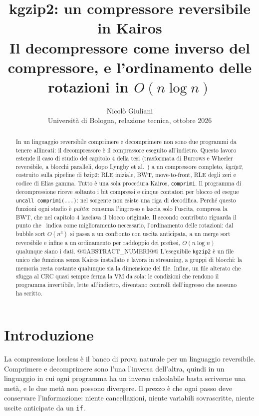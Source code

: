 \documentclass[11pt,a4paper]{article}
\title{\textbf{kgzip2: un compressore reversibile in Kairos}\\[4pt]
\large Il decompressore come inverso del compressore, e l'ordinamento delle rotazioni in $O(n\log n)$}
\author{Nicolò Giuliani\\[2pt]\small Università di Bologna, relazione tecnica, ottobre 2026}
\date{}
\newcommand{\kw}[1]{\texttt{#1}}
\begin{document}
\maketitle

\begin{abstract}
In un linguaggio reversibile comprimere e decomprimere non sono due programmi da tenere allineati: il decompressore è il compressore eseguito all'indietro. Questo lavoro estende il caso di studio del capitolo 4 della tesi (trasformata di Burrows e Wheeler reversibile, a blocchi paralleli, dopo Lyngby et al.~\cite{lyngby}) a un compressore completo, \emph{kgzip2}, costruito sulla pipeline di bzip2: RLE iniziale, BWT, move-to-front, RLE degli zeri e codice di Elias gamma. Tutto è una sola procedura Kairos, \kw{comprimi}. Il programma di decompressione riceve soltanto i bit compressi e cinque contatori per blocco ed esegue \kw{uncall comprimi(...)}: nel sorgente non esiste una riga di decodifica. Perché questo funzioni ogni stadio è \emph{pulito}: consuma l'ingresso e lascia solo l'uscita, compresa la BWT, che nel capitolo 4 lasciava il blocco originale. Il secondo contributo riguarda il punto che~\cite{lyngby} indica come miglioramento necessario, l'ordinamento delle rotazioni: dal bubble sort $O(n^3)$ si passa a un confronto con uscita anticipata, a un merge sort reversibile e infine a un ordinamento per raddoppio dei prefissi, $O(n\log n)$ qualunque siano i dati. @@ABSTRACT_NUMERI@@ L'eseguibile \kw{kgzip2} è un file unico che funziona senza Kairos installato e lavora in streaming, a gruppi di blocchi: la memoria resta costante qualunque sia la dimensione del file. Infine, un file alterato che sfugga al CRC quasi sempre ferma la VM da sola: le condizioni che rendono il programma invertibile, lette all'indietro, diventano controlli dell'ingresso che nessuno ha scritto.
\end{abstract}

\section{Introduzione}

La compressione lossless è il banco di prova naturale per un linguaggio reversibile. Comprimere e decomprimere sono l'una l'inversa dell'altra, quindi in un linguaggio in cui ogni programma ha un inverso calcolabile basta scriverne una metà, e le due metà non possono divergere. Il prezzo è che ogni passo deve conservare l'informazione: niente cancellazioni, niente variabili sovrascritte, niente uscite anticipate da un \kw{if}.
\end{document}
